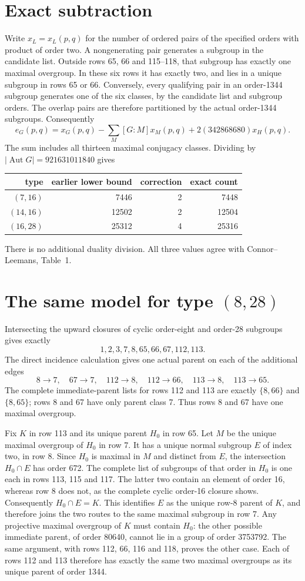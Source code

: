 \documentclass[11pt,a4paper]{article}
\begin{document}
\section{Exact subtraction}
Write $x_L=x_L(p,q)$ for the number of ordered pairs of the specified
orders with product of order two. A nongenerating pair generates a
subgroup in the candidate list. Outside rows 65, 66 and 115--118, that
subgroup has exactly one maximal overgroup. In these six rows it has
exactly two, and lies in a unique subgroup in rows 65 or 66. Conversely,
every qualifying pair in an order-1344 subgroup generates one of the
six classes, by the candidate list and subgroup orders. The overlap
pairs are therefore partitioned by the actual order-1344 subgroups.
Consequently
\[
 e_G(p,q)=x_G(p,q)-\sum_M[G:M]x_M(p,q)
             +2(342868680)x_H(p,q).
\]
The sum includes all thirteen maximal conjugacy classes. Dividing by
$|\operatorname{Aut}G|=921631011840$ gives
\begin{center}\begin{tabular}{rrrr}\toprule
type&earlier lower bound&correction&exact count\\\midrule
$(7,16)$&7446&2&7448\\
$(14,16)$&12502&2&12504\\
$(16,28)$&25312&4&25316\\\bottomrule
\end{tabular}\end{center}
There is no additional duality division. All three values agree with
Connor--Leemans, Table~1. \section{The same model for type $(8,28)$}
Intersecting the upward closures of cyclic order-eight and order-28
subgroups gives exactly
\[
                    1,2,3,7,8,65,66,67,112,113.               \tag{*}
\]
The direct incidence calculation gives one actual parent on each
of the additional edges
\[
8\to7,\quad67\to7,\quad112\to8,\quad112\to66,
\quad113\to8,\quad113\to65.
\]
The complete immediate-parent lists for rows 112 and 113 are exactly
$\{8,66\}$ and $\{8,65\}$; rows 8 and 67 have only parent class 7.
Thus rows 8 and 67 have one maximal overgroup.

Fix $K$ in row 113 and its unique parent $H_0$ in row 65. Let $M$
be the unique maximal overgroup of $H_0$ in row 7. It has a unique
normal subgroup $E$ of index two, in row 8. Since $H_0$ is maximal
in $M$ and distinct from $E$, the intersection $H_0\cap E$ has
order 672. The complete list of subgroups of that order in $H_0$
is one each in rows 113, 115 and 117. The latter two contain
an element of order 16, whereas row 8 does not, as the complete
cyclic order-16 closure shows. Consequently $H_0\cap E=K$.
This identifies $E$ as the unique row-8 parent of $K$, and therefore
joins the two routes to the same maximal subgroup in row 7.
Any projective maximal overgroup of $K$ must contain $H_0$:
the other possible immediate parent, of order 80640, cannot lie
in a group of order 3753792. The same argument, with rows 112,
66, 116 and 118, proves the other case. Each of rows 112 and 113
therefore has exactly the same two maximal overgroups as its
unique parent of order 1344.
\end{document}
